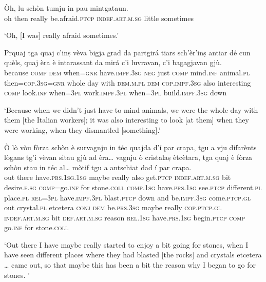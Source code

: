 \begin{linenumbers}
\gll  Òh, lu schòn tumju in pau mintgataun.  \\
oh then really be.afraid.\textsc{ptcp} \textsc{indef.art.m.sg} little sometimes  \\
\end{linenumbers}
\medskip
\glt `Oh, [I was] really afraid sometimes.'
\medskip

\begin{linenumbers}
\gll  Prquaj tga quaj c’inṣ vèva bigja grad da partgirá tiars sch’èr’inṣ antiar dé cun quèls, quaj èra è intarassant da mirá c’i luvravan, c'i bagagjavan gjù.  \\
because \textsc{comp} \textsc{dem} when\textsc{=gnr} have.\textsc{impf.3sg}  \textsc{neg} just  \textsc{comp} mind.\textsc{inf} animal.\textsc{pl} then=\textsc{cop.3sg=gnr} whole day with \textsc{dem.m.pl} \textsc{dem} \textsc{cop.impf.3sg} also interesting  \textsc{comp} look.\textsc{inf} when=\textsc{3pl} work.\textsc{impf.3pl} when=\textsc{3pl} build.\textsc{impf.3sg} down\\
\end{linenumbers}
\medskip
\glt `Because when we didn’t just have to mind animals, we were the whole day with them [the Italian workers]; it was also interesting to look [at them] when they were working, when they dismantled [something].'
\medskip

\begin{linenumbers}
\gll  Ò lò vòu fòrza schòn è survagnju in téc quajda d'í par crapa, tgu a vju difarènts lògans tg’i vèvan sitau gjù ad èra… vagnju ò cristalaṣ ètcètara, tga quaj è fòrza schòn stau in téc al… mòtif tgu a antschiat dad í par crapa.   \\
out there  have.\textsc{prs.1sg.1sg} maybe really  also get.\textsc{ptcp} \textsc{indef.art.m.sg} bit desire.\textsc{f.sg}  \textsc{comp}=go.\textsc{inf} for stone.\textsc{coll} \textsc{comp.1sg} have.\textsc{prs.1sg} see.\textsc{ptcp} different.\textsc{pl} place.\textsc{pl} \textsc{rel=3pl} have.\textsc{impf.3pl} blast.\textsc{ptcp} down and  be.\textsc{impf.3sg} come.\textsc{ptcp.gl} out crystal.\textsc{pl} etcetera \textsc{conj} \textsc{dem} be.\textsc{prs.3sg} maybe really  \textsc{cop.ptcp.gl} \textsc{indef.art.m.sg} bit \textsc{def.art.m.sg} reason \textsc{rel.1sg} have.\textsc{prs.1sg} begin.\textsc{ptcp} \textsc{comp} go.\textsc{inf} for stone.\textsc{coll} \textsc{} \textsc{} \\
\end{linenumbers}
\medskip
\glt `Out there I have maybe really started to enjoy a bit going for stones, when I have seen different places where they had blasted [the rocks] and crystals etcetera … came out, so that maybe this has been a bit the reason why I began to go for stones. '
\medskip

